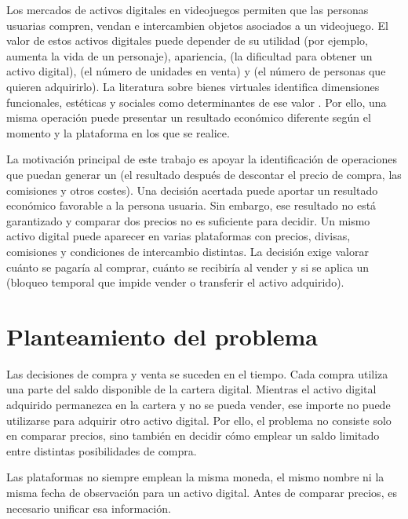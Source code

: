 Los mercados de activos digitales en videojuegos permiten que las personas usuarias compren, vendan e intercambien objetos asociados a un videojuego. El valor de estos activos digitales puede depender de su utilidad (por ejemplo, aumenta la vida de un personaje), apariencia, \textbf{} (la dificultad para obtener un activo digital), \textbf{} (el número de unidades en venta) y \textbf{} (el número de personas que quieren adquirirlo). La literatura sobre bienes virtuales identifica dimensiones funcionales, estéticas y sociales como determinantes de ese valor \cite{lehdonvirta2009virtual}. Por ello, una misma operación puede presentar un resultado económico diferente según el momento y la plataforma en los que se realice.

La motivación principal de este trabajo es apoyar la identificación de operaciones que puedan generar un \textbf{} (el resultado después de descontar el precio de compra, las comisiones y otros costes). Una decisión acertada puede aportar un resultado económico favorable a la persona usuaria. Sin embargo, ese resultado no está garantizado y comparar dos precios no es suficiente para decidir. Un mismo activo digital puede aparecer en varias plataformas con precios, divisas, comisiones y condiciones de intercambio distintas. La decisión exige valorar cuánto se pagaría al comprar, cuánto se recibiría al vender y si se aplica un \textbf{} (bloqueo temporal que impide vender o transferir el activo adquirido).

\section{Planteamiento del problema}

Las decisiones de compra y venta se suceden en el tiempo. Cada compra utiliza una parte del saldo disponible de la cartera digital. Mientras el activo digital adquirido permanezca en la cartera y no se pueda vender, ese importe no puede utilizarse para adquirir otro activo digital. Por ello, el problema no consiste solo en comparar precios, sino también en decidir cómo emplear un saldo limitado entre distintas posibilidades de compra.

Las plataformas no siempre emplean la misma moneda, el mismo nombre ni la misma fecha de observación para un activo digital. Antes de comparar precios, es necesario unificar esa información.

